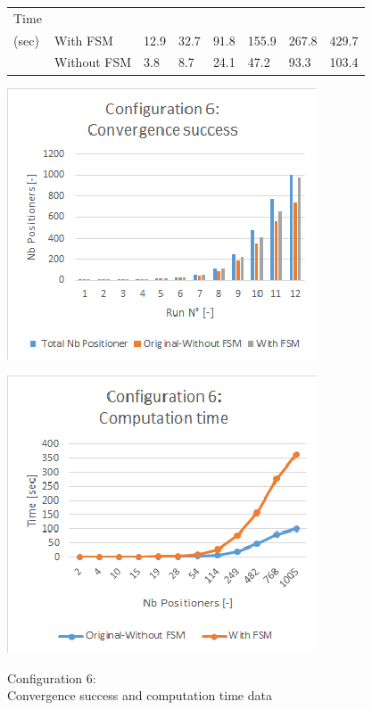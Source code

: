 \documentclass[]{spie}  %
\begin{document}
\begin{figure}[H]
\begin{minipage}{8.6cm}
{\begin{tabular}{|l|l|l|l|l|l|l|l|}
				\hline
				Time\\(sec) & With FSM  & 12.9 & 32.7  & 91.8 & 155.9 & 267.8 & 429.7 \\
				\cline{2-8}
				& Without FSM  & 3.8  & 8.7 & 24.1 & 47.2 & 93.3  & 103.4 \\
				\hline
			\end{tabular}
			}
			\label{configuration5_result} 
		\end{minipage}
		\begin{minipage}{7.5cm}
			\begin{minipage}[t]{4.2cm}
				\includegraphics[scale=0.56]{images/configuration6_conv}
				\label{configuration1_conv}
			\end{minipage}
			\begin{minipage}[t]{1.0cm}
				\includegraphics[scale=0.56]{images/configuration6_time}
				\label{configuration1_time}
			\end{minipage}
			\caption{\centering Configuration 6:\\
				Convergence success and computation time data
}
\end{minipage}
\end{figure}
\end{document}
